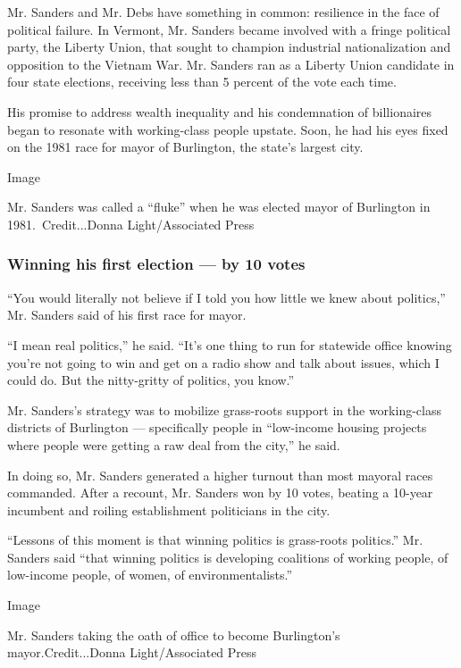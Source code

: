 Mr. Sanders and Mr. Debs have something in common: resilience in the
face of political failure. In Vermont, Mr. Sanders became involved with
a fringe political party, the Liberty Union, that sought to champion
industrial nationalization and opposition to the Vietnam War. Mr.
Sanders ran as a Liberty Union candidate in four state elections,
receiving less than 5 percent of the vote each time.

His promise to address wealth inequality and his condemnation of
billionaires began to resonate with working-class people upstate. Soon,
he had his eyes fixed on the 1981 race for mayor of Burlington, the
state's largest city.

Image

Mr. Sanders was called a ``fluke'' when he was elected mayor of
Burlington in 1981.~Credit...Donna Light/Associated Press

\hypertarget{winning-his-first-election--by-10-votes}{%
\subsubsection{Winning his first election --- by 10
votes}\label{winning-his-first-election--by-10-votes}}

``You would literally not believe if I told you how little we knew about
politics,'' Mr. Sanders said of his first race for mayor.

``I mean real politics,'' he said. ``It's one thing to run for statewide
office knowing you're not going to win and get on a radio show and talk
about issues, which I could do. But the nitty-gritty of politics, you
know.''

Mr. Sanders's strategy was to mobilize grass-roots support in the
working-class districts of Burlington --- specifically people in
``low-income housing projects where people were getting a raw deal from
the city,'' he said.

In doing so, Mr. Sanders generated a higher turnout than most mayoral
races commanded. After a recount, Mr. Sanders won by 10 votes, beating a
10-year incumbent and roiling establishment politicians in the city.

``Lessons of this moment is that winning politics is grass-roots
politics.'' Mr. Sanders said ``that winning politics is developing
coalitions of working people, of low-income people, of women, of
environmentalists.''

Image

Mr. Sanders taking the oath of office to become Burlington's
mayor.Credit...Donna Light/Associated Press

